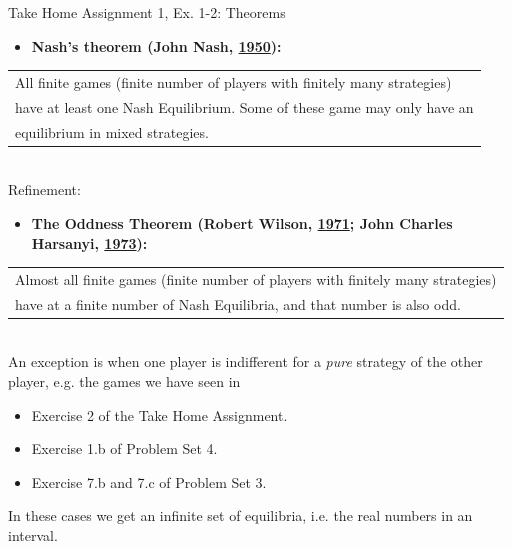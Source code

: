 \begin{frame}{Take Home Assignment 1, Ex. 1-2: Theorems}
  \begin{itemize}
    \item[(1)] \textbf{Nash's theorem (John Nash, \href{https://rbsc.princeton.edu/sites/default/files/Non-Cooperative_Games_Nash.pdf}{1950}):}
  \end{itemize}
    \begin{tabular}{|l|}
      \cline{1-1}
        All finite games (finite number of players with finitely many strategies)\\
        have at least one Nash Equilibrium. Some of these game may only have an\\
        equilibrium in mixed strategies.\\\cline{1-1}
    \end{tabular}\\\bigskip
  Refinement:
  \begin{itemize}
    \item[(2)] \textbf{The Oddness Theorem (Robert Wilson, \href{http://www.dklevine.com/archive/refs4402.pdf}{1971}; John Charles Harsanyi, \href{https://link.springer.com/article/10.1007\%2FBF01737572#page-1 }{1973}):}
  \end{itemize}
    \begin{tabular}{|l|}
      \cline{1-1}
        Almost all finite games (finite number of players with finitely many strategies)\\
        have at a finite number of Nash Equilibria, and that number is also odd.\\\cline{1-1}
    \end{tabular}\\\medskip
    An exception is when one player is indifferent for a \textit{pure} strategy of the other player, e.g. the games we have seen in
    \begin{itemize}
        \item Exercise 2 of the Take Home Assignment.
        \item Exercise 1.b of Problem Set 4.
        \item Exercise 7.b and 7.c of Problem Set 3.
    \end{itemize}
    In these cases we get an infinite set of equilibria, i.e. the real numbers in an interval.
  \vfill\null
\end{frame}

